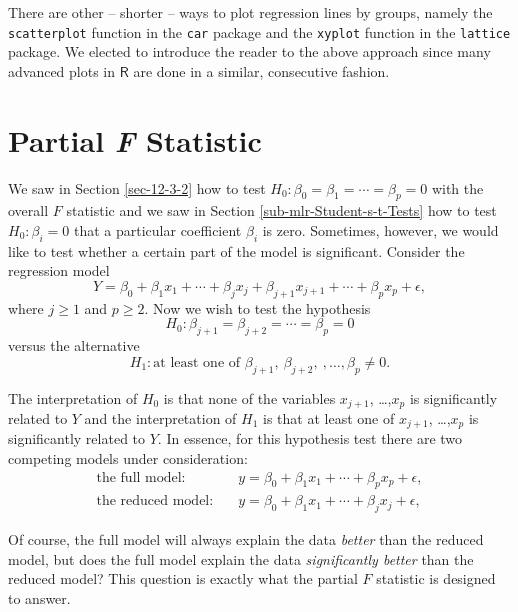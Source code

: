 \documentclass[captions=tableheading]{scrbook}
\begin{document}
There are other -- shorter -- ways to plot regression lines by groups, namely the \texttt{scatterplot} function in the \texttt{car} \cite{car} package and the \texttt{xyplot} function in the \texttt{lattice} package. We elected to introduce the reader to the above approach since many advanced plots in \(\mathsf{R}\) are done in a similar, consecutive fashion.
\section{Partial \emph{F} Statistic}
\label{sec-12-7}
\label{sec-Partial-F-Statistic}


We saw in Section \ref{sec-12-3-2} how to test \(H_{0}:\beta_{0}=\beta_{1}=\cdots=\beta_{p}=0\) with the overall \(F\) statistic and we saw in Section \ref{sub-mlr-Student-s-t-Tests} how to test \(H_{0}:\beta_{i}=0\) that a particular coefficient \(\beta_{i}\) is zero. Sometimes, however, we would like to test whether a certain part of the model is significant. Consider the regression model
\begin{equation}
Y=\beta_{0}+\beta_{1}x_{1}+\cdots+\beta_{j}x_{j}+\beta_{j+1}x_{j+1}+\cdots+\beta_{p}x_{p}+\epsilon,
\end{equation}
where \(j\geq1\) and \(p\geq2\). Now we wish to test the hypothesis
\begin{equation}
H_{0}:\beta_{j+1}=\beta_{j+2}=\cdots=\beta_{p}=0
\end{equation}
versus the alternative 
\begin{equation}
H_{1}:\mbox{at least one of $\beta_{j+1},\ \beta_{j+2},\ ,\ldots,\beta_{p}\neq0$}.
\end{equation}

The interpretation of \(H_{0}\) is that none of the variables \(x_{j+1}\), \ldots{},\(x_{p}\) is significantly related to \(Y\) and the interpretation of \(H_{1}\) is that at least one of \(x_{j+1}\), \ldots{},\(x_{p}\) is significantly related to \(Y\). In essence, for this hypothesis test there are two competing models under consideration:
\begin{align}
\mbox{the full model:} & \quad y=\beta_{0}+\beta_{1}x_{1}+\cdots+\beta_{p}x_{p}+\epsilon,\\
\mbox{the reduced model:} & \quad y=\beta_{0}+\beta_{1}x_{1}+\cdots+\beta_{j}x_{j}+\epsilon,
\end{align}

Of course, the full model will always explain the data \emph{better} than the reduced model, but does the full model explain the data \emph{significantly better} than the reduced model? This question is exactly what the partial \(F\) statistic is designed to answer.
\end{document}
